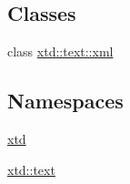 \subsection*{Classes}
\begin{DoxyCompactItemize}
\item 
class \hyperlink{classxtd_1_1text_1_1xml}{xtd\-::text\-::xml}
\end{DoxyCompactItemize}
\subsection*{Namespaces}
\begin{DoxyCompactItemize}
\item 
\hyperlink{namespacextd}{xtd}
\item 
\hyperlink{namespacextd_1_1text}{xtd\-::text}
\end{DoxyCompactItemize}
